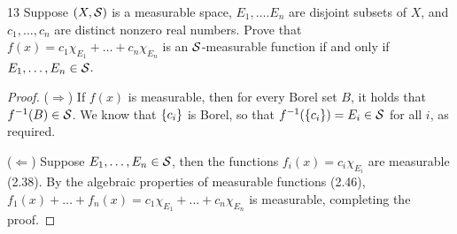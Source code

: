 \begin{exercise}{13}
Suppose $(X, \mathcal{S})$ is a measurable space, $E_1, \dots. E_n$ are disjoint subsets of $X$, and $c_1, \dots, c_n$ are distinct nonzero real numbers.
Prove that $f(x) = c_1 \chi_{E_1} + \dots + c_n \chi_{E_n}$ is an $\mathcal{S}$-measurable function if and only if $E_1, \dots, E_n \in \mathcal{S}$.
\end{exercise}
\begin{proof}
($\Rightarrow$)
If $f(x)$ is measurable, then  for every Borel set $B$, it holds that $f^{-1}(B) \in \mathcal{S}$.
We know that $\{c_i\}$ is Borel, so that $f^{-1}(\{c_i\}) = E_i \in \mathcal{S}$ for all $i$, as required.

($\Leftarrow$)
Suppose $E_1, \dots, E_n \in \mathcal{S}$, then the functions $f_i(x) = c_i \chi_{E_i}$ are measurable (2.38).
By the algebraic properties of measurable functions (2.46), $f_1(x) + \dots + f_n(x) = c_1 \chi_{E_1} + \dots + c_n \chi_{E_n}$ is measurable, completing the proof.
\end{proof} 

